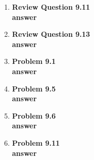 \documentclass[12pt]{article}
\begin{document}
\renewcommand{\headrulewidth}{0.4pt}
\vspace{-3mm}
\begin{enumerate}
  \item \textbf{Review Question 9.11} \\

  \textbf{answer} \\

  \item \textbf{Review Question 9.13} \\

  \textbf{answer} \\

  \item \textbf{Problem 9.1} \\

  \textbf{answer} \\

  \item \textbf{Problem 9.5} \\

  \textbf{answer} \\

  \item \textbf{Problem 9.6} \\

  \textbf{answer} \\

  \item \textbf{Problem 9.11}\\

  \textbf{answer} \\

\end{enumerate}
\end{document}
